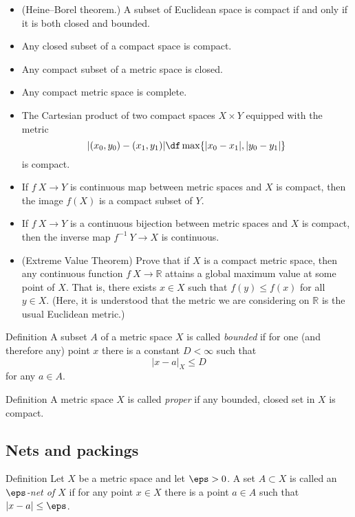 \begin{itemize}
\item (Heine--Borel theorem.) A subset of Euclidean space is compact if and only if it is both closed and bounded.
\item Any closed subset of a compact space is compact.
\item\label{compact=>closed} Any compact subset of a metric space is closed.
\item Any compact metric space is complete.
\item The Cartesian product of two compact spaces $X\times Y$ equipped with the metric 
$$|(x_0,y_0)-(x_1,y_1)|\df \max\{|x_0-x_1|,|y_0-y_1|\}$$
is compact.
\item \label{ex:compact-image}
If $f\: X \to Y$ is continuous map between metric spaces and $X$ is compact, then the image $f(X)$ is a compact subset of $Y$.
\item\label{ex:compact-homeo}
If $f\: X \to Y$ is a continuous bijection between metric spaces and $X$ is compact, then the inverse map $f^{-1}\: Y \to X$ is continuous.
\item\label{ex:EVT}
(Extreme Value Theorem) Prove that if $X$ is a compact metric space, then any continuous function $f\: X \to \mathbb{R}$ attains a global maximum value at some point of $X$.  That is, there exists $x \in X$ such that $f(y) \leq f(x)$ for all $y \in X$.
(Here, it is understood that the metric we are considering on $\mathbb{R}$ is the usual Euclidean metric.)
\end{itemize}

\begin{thm}{Definition}
A subset $A$ of a metric space $X$ is called \emph{bounded} if for one (and therefore any) point $x$ there is a constant $D<\infty$ such that 
$$|x-a|_X\le D$$ for any $a\in A$.
\end{thm}


\begin{thm}{Definition}\label{def:proper}
A metric space $X$ is called \emph{proper} if any bounded, 
closed set in $X$ is compact.
\end{thm}


\subsection*{Nets and packings}

\begin{thm}{Definition}
Let $X$ be a metric space and let $\eps>0$.
A set $A\subset X$ is called an \emph{$\eps$-net of $X$} if for any point $x\in X$ there is a point $a\in A$
such that $|x-a|\le\eps$.
\end{thm}

